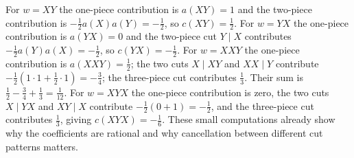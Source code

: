 \begin{example}
For $w=XY$ the one-piece contribution is $a(XY)=1$ and the two-piece
contribution is $-\tfrac12a(X)a(Y)=-\tfrac12$, so $c(XY)=\tfrac12$. For
$w=YX$ the one-piece contribution is $a(YX)=0$ and the two-piece cut
$Y\mid X$ contributes $-\tfrac12a(Y)a(X)=-\tfrac12$, so $c(YX)=-\tfrac12$. For
$w=XXY$ the one-piece contribution is $a(XXY)=\tfrac12$; the two cuts
$X\mid XY$ and $XX\mid Y$ contribute $-\tfrac12(1\cdot1+\tfrac12\cdot1)
=-\tfrac34$; the three-piece cut contributes $\tfrac13$. Their sum is
$\tfrac12-\tfrac34+\tfrac13=\tfrac1{12}$. For $w=XYX$ the one-piece
contribution is zero, the two cuts $X\mid YX$ and $XY\mid X$ contribute
$-\tfrac12(0+1)=-\tfrac12$, and the three-piece cut contributes $\tfrac13$,
giving $c(XYX)=-\tfrac16$. These small computations already show why the
coefficients are rational and why cancellation between different cut
patterns matters.
\end{example}


